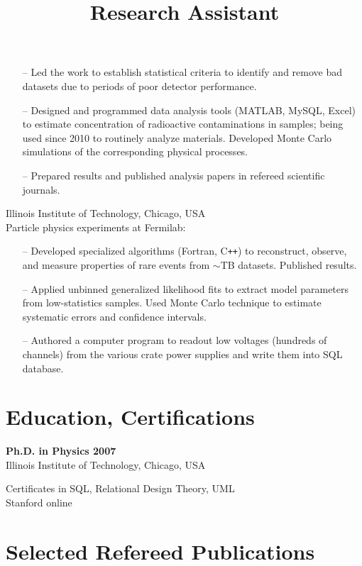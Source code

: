 \documentclass[overlapped, line, 10pt]{res}
\begin{document}
\begin{resume}
\begin{position}
\vspace{1ex}
\begin{itemize}
\item[--] Led the work to establish statistical criteria to identify and remove bad datasets due to periods of poor detector performance.
\item[--] Designed and programmed data analysis tools (MATLAB, MySQL, Excel) to estimate concentration of radioactive contaminations in samples; being used since 2010 to routinely analyze materials. Developed Monte Carlo simulations of the corresponding physical processes. 
\item[--] Prepared results and published analysis papers in refereed scientific journals.
\end{itemize}
\end{position}

\title{Research Assistant}
\begin{position}
Illinois Institute of Technology, Chicago, USA\\
Particle physics experiments at Fermilab:
\begin{itemize}
\item[--] Developed specialized algorithms (Fortran, C\texttt{++}) to reconstruct, observe, and measure properties of rare events from $\sim$TB datasets. Published results.
\item[--] Applied unbinned generalized likelihood fits to extract model parameters from low-statistics samples. Used Monte Carlo technique to estimate systematic errors and confidence intervals.
\item[--] Authored a computer program to readout low voltages (hundreds of channels) from the various crate power supplies and write them into SQL database.
\end{itemize}
\end{position}

\section{\sc Education, Certifications}
\textbf{Ph.D. in Physics \hfill 2007}\\
Illinois Institute of Technology, Chicago, USA

Certificates in SQL, Relational Design Theory, UML\\
Stanford online

\section{\sc Selected Refereed Publications}


\end{resume}
\end{document}
